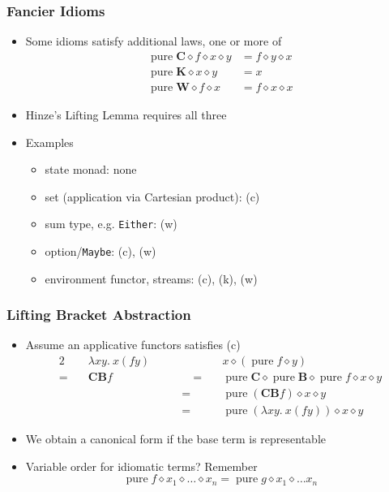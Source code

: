 \documentclass[smaller,leqno]{beamer}
\DeclareMathOperator{\pure}{pure}
\newcommand{\ap}{\diamond}
\begin{document}
\begin{frame}
\frametitle{Fancier Idioms}

\begin{itemize}
\item Some idioms satisfy additional laws, one or more of
\begin{align*}
\pure \mathbf{C} \ap f \ap x \ap y &= f \ap y \ap x \tag{c}\\
\pure \mathbf{K} \ap x \ap y &= x \tag{k}\\
\pure \mathbf{W} \ap f \ap x &= f \ap x \ap x \tag{w}
\end{align*}
\item Hinze's Lifting Lemma requires all three
\item Examples
\begin{itemize}
\item state monad: none
\item set (application via Cartesian product): (c)
\item sum type, e.g. \lstinline|Either|: (w)
\item option/\lstinline|Maybe|: (c), (w)
\item environment functor, streams: (c), (k), (w)
\end{itemize}
\end{itemize}
\end{frame}

\begin{frame}
\frametitle{Lifting Bracket Abstraction}

\begin{itemize}
\item Assume an applicative functors satisfies (c)
\begin{alignat*}{2}
\quad& \lambda x y.\> x (f y) & \quad& x \ap (\pure f \ap y) \\
=\quad& \mathbf{C B} f & \quad\qquad=\quad& \pure \mathbf{C} \ap \pure \mathbf{B} \ap \pure f \ap x \ap y \\
& & \qquad=\quad& \pure{(\mathbf{C B} f)} \ap x \ap y \\
& & \qquad=\quad& \pure{(\lambda x y.\> x (f y))} \ap x \ap y
\end{alignat*}

\item We obtain a canonical form if the base term is representable
\pause\item Variable order for idiomatic terms? Remember
\[ \pure f \ap x_1 \ap \dots \ap x_n = \pure g \ap x_1 \ap \dots x_n \]
\end{itemize}
\end{frame}
\end{document}
